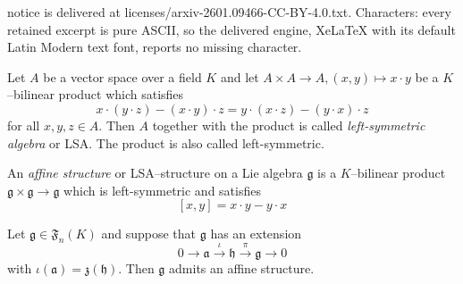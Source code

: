 \documentclass[10pt,a4paper]{amsart}
\newcommand{\LF}{\mathfrak{F}}
\newcommand{\La}{\mathfrak{a}}
\newcommand{\Lg}{\mathfrak{g}}
\newcommand{\Lh}{\mathfrak{h}}
\newcommand{\Lz}{\mathfrak{z}}
\begin{document}
notice is delivered at licenses/arxiv-2601.09466-CC-BY-4.0.txt. Characters: every retained excerpt is pure ASCII, so the delivered engine, XeLaTeX with its default Latin Modern text font, reports no missing character.
\begin{defi}
Let $A$ be a vector space
over a field $K$ and let $A \times A \rightarrow A,
(x,y) \mapsto x\cdot y$ be a $K$--bilinear product which satisfies
\begin{equation}\label{lsa1}
x\cdot (y\cdot z)-(x\cdot y)\cdot z= y\cdot (x\cdot z)-(y\cdot x)\cdot z
\end{equation}
for all $x,y,z \in A$. Then $A$ together with the product
is called {\it left-symmetric algebra} or
LSA. The product is also called left-symmetric.
\end{defi}

\begin{defi}\label{affine}
An {\it affine structure} or {LSA--structure} on a Lie algebra
$\Lg$ is a $K$--bilinear product $\Lg \times \Lg \rightarrow \Lg$
which is left-symmetric and satisfies
\begin{equation}\label{lsa2}
[x,y]=x\cdot y -y\cdot x
\end{equation}
\end{defi}

\begin{thm} \label{ext}
Let $\Lg\in\LF_n(K)$ and suppose that $\Lg$
has an extension
\begin{equation*}
0 \rightarrow \La \xrightarrow{\iota} \Lh \xrightarrow{\pi}
\Lg \rightarrow 0
\end{equation*}
with $\iota(\La)=\Lz(\Lh)$. Then $\Lg$ admits an affine structure.
\end{thm}  
\end{document}
